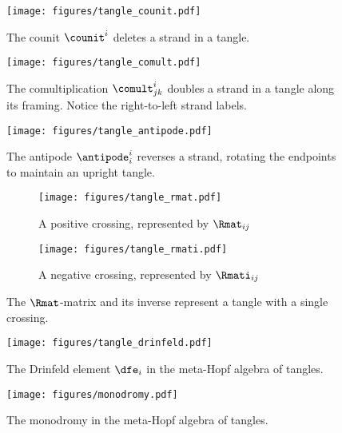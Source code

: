 \begin{figure}[h]
        \centering
        \texttt{[image: figures/tangle\_counit.pdf]}
        \caption{The counit $\counit^i$ deletes a strand in a tangle.}
        \label{fig:tangle_counit}
\end{figure}
\begin{figure}[h]
        \centering
        \texttt{[image: figures/tangle\_comult.pdf]}
        \caption{The comultiplication $\comult^{i}_{jk}$ doubles a strand in a tangle
        along its framing. Notice the right-to-left strand labels.}
        \label{fig:tangle_comult}
\end{figure}
\begin{figure}[h]
        \centering
        \texttt{[image: figures/tangle\_antipode.pdf]}
        \caption{The antipode $\antipode^{i}_{i}$ reverses a strand, rotating the
        endpoints to maintain an upright tangle.}
        \label{fig:tangle_antipode}
\end{figure}
\begin{figure}[h]
        \centering
        \begin{subfigure}[b]{0.4\textwidth}
                \centering
                \texttt{[image: figures/tangle\_rmat.pdf]}
                \caption{A positive crossing, represented by $\Rmat_{ij}$}
                \label{fig:tangle_rmat}
        \end{subfigure}
        \begin{subfigure}[b]{0.4\textwidth}
                \centering
                \texttt{[image: figures/tangle\_rmati.pdf]}
                \caption{A negative crossing, represented by $\Rmati_{ij}$}
                \label{fig:tangle_rmati}
        \end{subfigure}
        \caption{The $\Rmat$-matrix and its inverse represent a tangle with a
        single crossing.}
        \label{fig:tangle_rmats}
\end{figure}
\begin{figure}[h]
        \centering
        \texttt{[image: figures/tangle\_drinfeld.pdf]}
        \caption{The Drinfeld element $\dfe_i$ in the meta-Hopf algebra of
        tangles.}
        \label{fig:tangle_drinfeld}
\end{figure}
\begin{figure}[h]
        \centering
        \texttt{[image: figures/monodromy.pdf]}
        \caption{The monodromy in the meta-Hopf algebra of tangles.}
        \label{fig:monodromy}
\end{figure}
